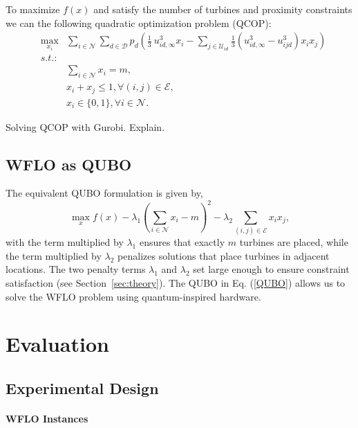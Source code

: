 \documentclass[preprint,12pt]{elsarticle}
\begin{document}
To 
maximize $f(x)$ and satisfy the number of turbines and proximity 
constraints we can 
the following quadratic optimization problem (QCOP):
\begin{eqnarray} \label{QCOP}
&\max_{x_i}^{}& \sum_{i \in \mathcal{N}}^{} \sum_{d \in \mathcal{D}}^{} p_d ( \frac{1}{3} \ u_{id, \infty}^3 x_i  - \sum_{j \in \mathcal{U}_{id}}^{} \frac{1}{3}(u_{id, \infty} ^3 - u_{ijd}^3)x_i x_j)   \\
&s.t.:& \nonumber\\
&\mbox{       }& \sum_{i \in \mathcal{N}}^{} x_i = m,\label{Cardinality}\\
&\mbox{       }& x_i + x_j \leq 1,   \forall (i,j) \in \mathcal{E}, \label{Grid}\\
&\mbox{       }& x_i \in \{0,1\},     \forall i \in \mathcal{N}.
\end{eqnarray} 

Solving QCOP with Gurobi. Explain.



\subsection{WFLO as QUBO}

The equivalent QUBO formulation is given by,
\begin{equation}\max_{x}^{} f(x) - \lambda_1 (\sum_{i \in \mathcal{N}}^{} x_i -m) ^2 - \lambda_2 \sum_{(i,j) \in \mathcal{E}}^{} x_i x_j , \label{QUBO}\end{equation}
with the term multiplied by $\lambda_1$ 
ensures that exactly $m$ turbines are placed, while the term multiplied by $\lambda_2$ penalizes
solutions that place turbines in adjacent locations. The two penalty terms $\lambda_1$ and $\lambda_2$ set large enough to ensure constraint satisfaction (see Section~\ref{sec:theory}). The QUBO in Eq. (\ref{QUBO}) allows us
to solve the WFLO problem using quantum-inspired hardware.  



\section{Evaluation}
\label{sec:eval}


\subsection{Experimental Design}



\paragraph{WFLO Instances}
\end{document}
